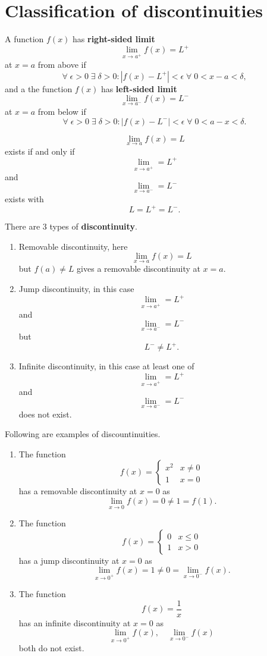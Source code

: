 \section{Classification of discontinuities}

\begin{definition}
    A function $f(x)$ has \textbf{right-sided limit} \[\lim_{x\to a^+}f(x)=L^+\] at $x=a$ from above if \[\forall\;\epsilon>0\;\exists\;\delta>0:|f(x)-L^+|<\epsilon\;\forall\;0<x-a<\delta,\] and a the function $f(x)$ has \textbf{left-sided limit} \[\lim_{x\to a^-}f(x)=L^-\] at $x=a$ from below if \[\forall\;\epsilon>0\;\exists\;\delta>0:|f(x)-L^-|<\epsilon\;\forall\;0<a-x<\delta.\]
\end{definition}

\begin{remark}
    \[\lim_{x\to a}f(x)=L\] exists if and only if \[\lim_{x\to a^+}=L^+\] and \[\lim_{x\to a^-}=L^-\] exists with \[L=L^+=L^-.\]
\end{remark}

\begin{definition}
    There are 3 types of \textbf{discontinuity}.
    \begin{enumerate}
        \item Removable discontinuity, here \[\lim_{x\to a}f(x)=L\] but $f(a)\neq L$ gives a removable discontinuity at $x=a$.
        \item Jump discontinuity, in this case \[\lim_{x\to a^+}=L^+\] and \[\lim_{x\to a^-}=L^-\] but \[L^-\neq L^+.\]
        \item Infinite discontinuity, in this case at least one of \[\lim_{x\to a^+}=L^+\] and \[\lim_{x\to a^-}=L^-\] does not exist.
        
    \end{enumerate}
\end{definition}

\begin{example}
    Following are examples of discountinuities.
    \begin{enumerate}
        \item The function
        \[
            f(x)=
            \begin{cases}
                x^2&x\neq0\\
                1&x=0
            \end{cases}
        \]
        has a removable discontinuity at $x=0$ as \[\lim_{x\to0}f(x)=0\neq1=f(1).\]
        
        \item The function
        \[
            f(x)=
            \begin{cases}
                0&x\leq0\\
                1&x>0
            \end{cases}
        \]
        has a jump discontinuity at $x=0$ as \[\lim_{x\to0^+}f(x)=1\neq0=\lim_{x\to0^-}f(x).\]
        
        \item The function \[f(x)=\dfrac1x\] has an infinite discontinuity at $x=0$ as \[\lim_{x\to0^+}f(x),\quad\lim_{x\to0^-}f(x)\] both do not exist.
    \end{enumerate}
\end{example}

